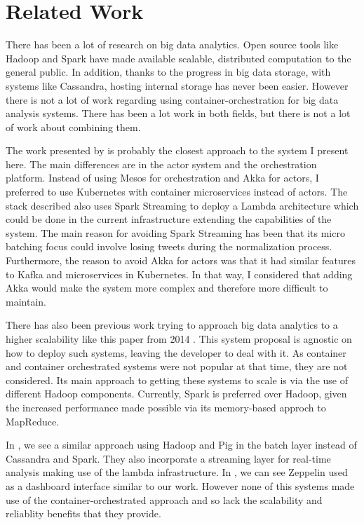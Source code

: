
\chapter{Related Work} %

\label{Chapter8} %

There has been a lot of research on big data analytics. Open source tools like Hadoop and Spark have made available scalable, distributed computation to the general public. In addition, thanks to the progress in big data storage, with systems like Cassandra, hosting internal storage has never been easier. However there is not a lot of work regarding using container-orchestration for big data analysis systems. There has been a lot work in both fields, but there is not a lot of work about combining them.

The work presented by \parencite{smack} is probably the closest approach to the system I present here. The main differences are in the actor system and the orchestration platform. Instead of using Mesos for orchestration and Akka for actors, I preferred to use Kubernetes with container microservices instead of actors. The stack described also uses Spark Streaming to deploy a Lambda architecture which could be done in the current infrastructure extending the capabilities of the system. The main reason for avoiding Spark Streaming has been that its micro batching focus could involve losing tweets during the normalization process. Furthermore, the reason to avoid Akka for actors was that it had similar features to Kafka and microservices in Kubernetes. In that way, I considered that adding Akka would make the system more complex and therefore more difficult to maintain.

There has also been previous work trying to approach big data analytics to a higher scalability like this paper from 2014 \parencite{scalableHadoop}. This system proposal is agnostic on how to deploy such systems, leaving the developer to deal with it. As container and container orchestrated systems were not popular at that time, they are not considered. Its main approach to getting these systems to scale is via the use of different Hadoop components. Currently, Spark is preferred over Hadoop, given the increased performance made possible via its memory-based approch to MapReduce.

In \parencite{lambda2014}, we see a similar approach using Hadoop and Pig in the batch layer instead of Cassandra and Spark. They also incorporate a streaming layer for real-time analysis making use of the lambda infrastructure. In \parencite{streamingAnalysis}, we can see Zeppelin used as a dashboard interface similar to our work. However none of this systems made use of the container-orchestrated approach and so lack the scalability and reliablity benefits that they provide.
